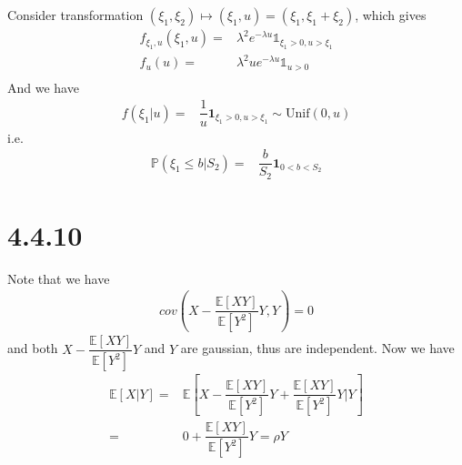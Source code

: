 \documentclass[11pt,a4paper]{ctexart}
\numberwithin{equation}{section}%
\begin{document}
\subsection{}
Consider transformation $ (\xi _1,\xi _2)\mapsto (\xi _1, u)=(\xi _1,\xi _1+\xi _2) $, which gives
\begin{align*}
    f_{\xi _1,u}(\xi _1,u)=& \lambda ^2e^{-\lambda u}\mathbb{1}_{ \xi _1>0,u>\xi _1 }\\
    f_u(u)=&\lambda ^2 u e^{-\lambda u} \mathbb{1}_{ u>0 }\\ 
\end{align*}
And we have
\begin{align*}
    f(\xi _1|u)=&\dfrac{ 1 }{ u } \mathbf{1}_{ \xi _1>0,u>\xi _1 }\sim \mathrm{ Unif }(0,u)  
\end{align*}
i.e.
\begin{align*}
    \mathbb{P}\left( \xi _1\leq b|S_2 \right) =& \dfrac{ b }{ S_2 }\mathbf{1}_{ 0<b<S_2 } 
\end{align*}

\section{4.4.10}

Note that we have
\begin{align*}
    cov(X-\dfrac{ \mathbb{E}\left[ XY \right]  }{ \mathbb{E}\left[ Y^2 \right]  }Y ,Y) =0 
\end{align*}
and both $ X-\dfrac{ \mathbb{E}\left[ XY \right]  }{ \mathbb{E}\left[ Y^2 \right]  }Y $ and $ Y $ are gaussian, thus are independent. Now we have
\begin{align*}
    \mathbb{E}\left[ X|Y \right] =&\mathbb{E}\left[ X-\dfrac{ \mathbb{E}\left[ XY \right]  }{ \mathbb{E}\left[ Y^2 \right]  }Y + \dfrac{ \mathbb{E}\left[ XY \right]  }{ \mathbb{E}\left[ Y^2 \right]  }Y |Y  \right]  \\
    =& 0 + \dfrac{ \mathbb{E}\left[ XY \right]  }{ \mathbb{E}\left[ Y^2 \right]  }Y= \rho Y                                                 
\end{align*}
\end{document}
